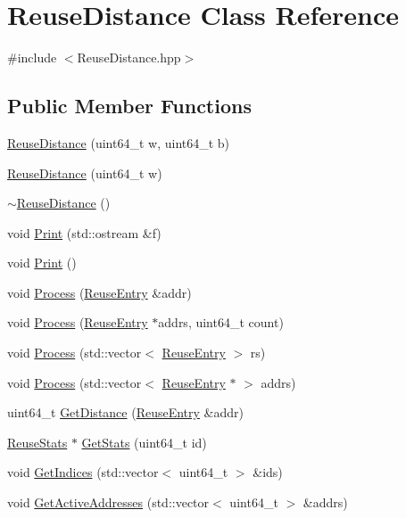 \hypertarget{class_reuse_distance}{
\section{ReuseDistance Class Reference}
\label{class_reuse_distance}
}


{\ttfamily \#include $<$ReuseDistance.hpp$>$}\subsection*{Public Member Functions}
\begin{DoxyCompactItemize}
\item 
\hyperlink{class_reuse_distance_a0248afa697da0f6c87c6fd30c289ecc6}{ReuseDistance} (uint64\_\-t w, uint64\_\-t b)
\item 
\hyperlink{class_reuse_distance_ab68a2d9df5c28571c3f8820c5344b2c1}{ReuseDistance} (uint64\_\-t w)
\item 
\hyperlink{class_reuse_distance_a2846a6f2c045759657b754838045900d}{$\sim$ReuseDistance} ()
\item 
void \hyperlink{class_reuse_distance_ac798c03bb891a51a6648df4b49e25212}{Print} (std::ostream \&f)
\item 
void \hyperlink{class_reuse_distance_a0cbab308f0c9262e570b994beac0544a}{Print} ()
\item 
void \hyperlink{class_reuse_distance_a4ff6b77022ce62e0fdefa5cc297b932a}{Process} (\hyperlink{struct_reuse_entry}{ReuseEntry} \&addr)
\item 
void \hyperlink{class_reuse_distance_aed9cbdd99de67972a37de4624614de9d}{Process} (\hyperlink{struct_reuse_entry}{ReuseEntry} $\ast$addrs, uint64\_\-t count)
\item 
void \hyperlink{class_reuse_distance_a372960c10d5fb6552c8dfcfd77da38ba}{Process} (std::vector$<$ \hyperlink{struct_reuse_entry}{ReuseEntry} $>$ rs)
\item 
void \hyperlink{class_reuse_distance_a88052f5ae1e69bab8fe1f9b7b87c1037}{Process} (std::vector$<$ \hyperlink{struct_reuse_entry}{ReuseEntry} $\ast$ $>$ addrs)
\item 
uint64\_\-t \hyperlink{class_reuse_distance_ac70a23e9dc4b242f11d76e257e894bef}{GetDistance} (\hyperlink{struct_reuse_entry}{ReuseEntry} \&addr)
\item 
\hyperlink{class_reuse_stats}{ReuseStats} $\ast$ \hyperlink{class_reuse_distance_a771580c25dc5140969919e959e2ebdd1}{GetStats} (uint64\_\-t id)
\item 
void \hyperlink{class_reuse_distance_a99fb4b3aae663676515ad354691b7cc6}{GetIndices} (std::vector$<$ uint64\_\-t $>$ \&ids)
\item 
void \hyperlink{class_reuse_distance_acc4885040a8a518fc10b5aa4da7d777a}{GetActiveAddresses} (std::vector$<$ uint64\_\-t $>$ \&addrs)
\end{DoxyCompactItemize}
